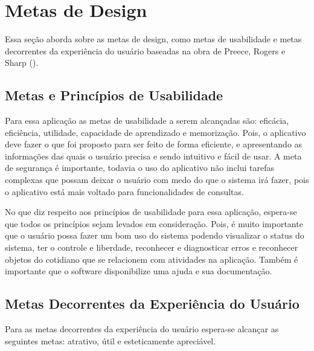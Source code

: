 \vfill
\chapter[Metas]{Metas de Design}
\label{metas}

Essa seção aborda sobre as metas de design, como metas de usabilidade e metas decorrentes da experiência do usuário baseadas na obra de Preece, Rogers e Sharp (\citeyear{preece}).
\section{Metas e Princípios de Usabilidade}

Para essa aplicação as metas de usabilidade a serem alcançadas são: eficácia, eficiência, utilidade, capacidade de aprendizado e memorização. Pois, o aplicativo deve fazer o que foi proposto para ser feito de forma eficiente, e apresentando as informações das quais o usuário precisa e sendo intuitivo e fácil de usar. A meta de segurança é importante, todavia o uso do aplicativo não inclui tarefas complexas que possam deixar o usuário com medo do que o sistema irá fazer, pois o aplicativo está mais voltado para funcionalidades de consultas.

No que diz respeito aos princípios de usabilidade para essa aplicação, espera-se que todos os princípios sejam levados em consideração. Pois, é muito importante que o usuário possa fazer um bom uso do sistema podendo visualizar o status do sistema, ter o controle e liberdade, reconhecer e diagnosticar erros e reconhecer objetos do cotidiano que se relacionem com atividades na aplicação. Também é importante que o software disponibilize uma ajuda e sua documentação.
\section{Metas Decorrentes da Experiência do Usuário}

Para as metas decorrentes da experiência do usuário espera-se alcançar as seguintes metas: atrativo, útil e esteticamente apreciável.